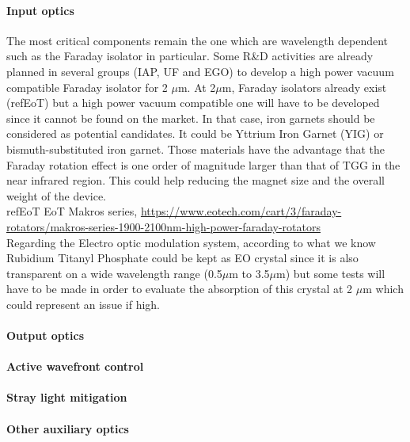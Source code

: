 \paragraph{Input optics}

The most critical components remain the one which are wavelength dependent such as the Faraday isolator in particular.  Some R\&D activities are already planned in several groups (IAP, UF and EGO) to develop a high power vacuum compatible Faraday isolator for 2 $\mu$m.
At 2$\mu$m, Faraday isolators already exist (refEoT) but a high power vacuum compatible one will have to be developed since it cannot be found on the market. In that case, iron garnets should be considered as potential candidates. It could be Yttrium Iron Garnet (YIG) or bismuth-substituted iron garnet. Those materials have the advantage that the Faraday rotation effect is one order of magnitude larger than that of TGG in the near infrared region. This could help reducing the magnet size and the overall weight of the device.\\

refEoT EoT Makros series, \url{https://www.eotech.com/cart/3/faraday-rotators/makros-series-1900-2100nm-high-power-faraday-rotators}\\

Regarding the Electro optic modulation system, according to what we know Rubidium Titanyl Phosphate could be kept as EO crystal since it is also transparent on a wide wavelength range (0.5$\mu$m to 3.5$\mu$m) but some tests will have to be made in order to evaluate the absorption of this crystal at 2 $\mu$m which could represent an issue if high.

\paragraph{Output optics}
\paragraph{Active wavefront control}
\paragraph{Stray light mitigation}
\paragraph{Other auxiliary optics}

